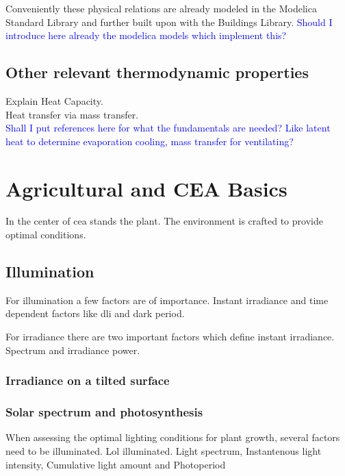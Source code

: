 Conveniently these physical relations are already modeled in the Modelica Standard Library and further built upon with the Buildings Library.
\textcolor{Blue}{Should I introduce here already the modelica models which implement this?}



\subsection{Other relevant thermodynamic properties}
\label{sub:ther-props}
Explain Heat Capacity.\\
Heat transfer via mass transfer.\\
\textcolor{Blue}{Shall I put references here for what the fundamentals are needed? Like latent heat to determine evaporation cooling, mass transfer for ventilating?}




\section{Agricultural and CEA Basics}
In the center of \ac{cea} stands the plant.
The environment is crafted to provide optimal conditions.

\subsection{Illumination}
For illumination a few factors are of importance.
Instant irradiance and time dependent factors like dli and dark period.

For irradiance there are two important factors which define instant irradiance.
Spectrum and irradiance power.
\subsubsection{Irradiance on a tilted surface}

\subsubsection{Solar spectrum and photosynthesis}
When assessing the optimal lighting conditions for plant growth, several factors need to be illuminated.
Lol illuminated.
Light spectrum, Instantenous light intensity, Cumulative light amount and Photoperiod

